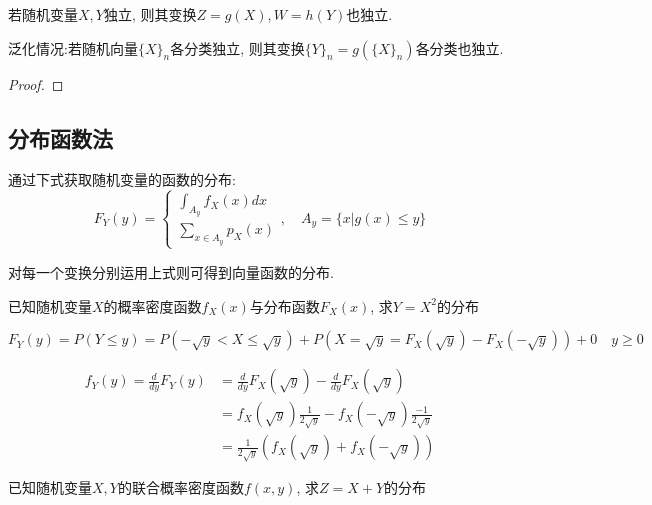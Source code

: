 \begin{theorem}[]
    若随机变量$X,Y$独立, 则其变换$Z=g(X), W=h(Y)$也独立.

    泛化情况:若随机向量$\{X\}_n$各分类独立, 则其变换$\{Y\}_n=g(\{X\}_n)$各分类也独立.
\end{theorem}

\begin{proof}
\end{proof}

\subsection{分布函数法}

通过下式获取随机变量的函数的分布:
\[ F_Y(y)=\begin{cases}
        \int_{A_y}f_X(x)dx \\
        \sum_{x \in A_y}p_X(x)
    \end{cases} , \quad A_y=\{ x|g(x)\le y \}
\]

对每一个变换分别运用上式则可得到向量函数的分布.

\begin{example}
    已知随机变量$X$的概率密度函数$f_X(x)$与分布函数$F_X(x)$, 求$Y=X^2$的分布
\end{example}

\begin{solution}
    \[ F_Y(y)=P(Y\le y)=P(-\sqrt{y}<X\le \sqrt{y})+P(X=\sqrt{y}=F_X(\sqrt{y})-F_X(-\sqrt{y}))+0 \quad y\ge 0\]

    \begin{align*}
        f_Y(y) =\frac{d}{dy}F_Y(y) & =\frac{d}{dy}F_X(\sqrt{y}) -\frac{d}{dy}F_X(\sqrt{y})                 \\
                                   & =f_X(\sqrt{y})\frac{1}{2\sqrt{y}} -f_X(-\sqrt{y})\frac{-1}{2\sqrt{y}} \\
                                   & =\frac{1}{2\sqrt{y}}(f_X(\sqrt{y})+f_X(-\sqrt{y}))
    \end{align*}
\end{solution}

\begin{example}\label{exp:sum_of_pdf}
    已知随机变量$X,Y$的联合概率密度函数$f(x,y)$, 求$Z=X+Y$的分布
\end{example}


